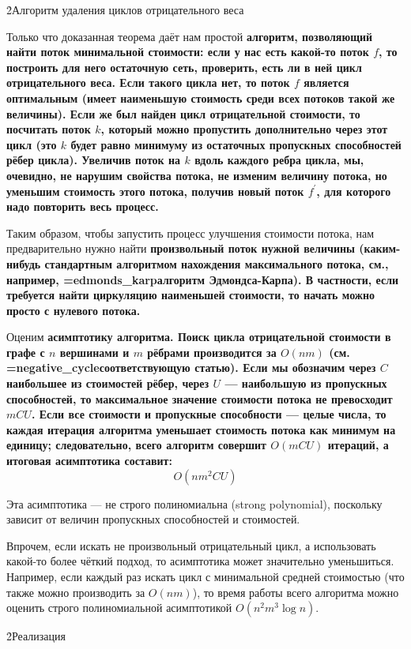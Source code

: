 \h2{Алгоритм удаления циклов отрицательного веса}

Только что доказанная теорема даёт нам простой \bf{алгоритм}, позволяющий найти поток минимальной стоимости: если у нас есть какой-то поток $f$, то построить для него остаточную сеть, проверить, есть ли в ней цикл отрицательного веса. Если такого цикла нет, то поток $f$ является оптимальным (имеет наименьшую стоимость среди всех потоков такой же величины). Если же был найден цикл отрицательной стоимости, то посчитать поток $k$, который можно пропустить дополнительно через этот цикл (это $k$ будет равно минимуму из остаточных пропускных способностей рёбер цикла). Увеличив поток на $k$ вдоль каждого ребра цикла, мы, очевидно, не нарушим свойства потока, не изменим величину потока, но уменьшим стоимость этого потока, получив новый поток $f^\prime$, для которого надо повторить весь процесс.

Таким образом, чтобы запустить процесс улучшения стоимости потока, нам предварительно нужно найти \bf{произвольный поток нужной величины} (каким-нибудь стандартным алгоритмом нахождения максимального потока, см., например, \algohref=edmonds_karp{алгоритм Эдмондса-Карпа}). В частности, если требуется найти циркуляцию наименьшей стоимости, то начать можно просто с нулевого потока.

Оценим \bf{асимптотику} алгоритма. Поиск цикла отрицательной стоимости в графе с $n$ вершинами и $m$ рёбрами производится за $O(nm)$ (см. \algohref=negative_cycle{соответствующую статью}). Если мы обозначим через $C$ наибольшее из стоимостей рёбер, через $U$ --- наибольшую из пропускных способностей, то максимальное значение стоимости потока не превосходит $mCU$. Если все стоимости и пропускные способности --- целые числа, то каждая итерация алгоритма уменьшает стоимость потока как минимум на единицу; следовательно, всего алгоритм совершит $O(mCU)$ итераций, а итоговая асимптотика составит:
$$ O(nm^2CU) $$

Эта асимптотика --- не строго полиномиальна (strong polynomial), поскольку зависит от величин пропускных способностей и стоимостей.

Впрочем, если искать не произвольный отрицательный цикл, а использовать какой-то более чёткий подход, то асимптотика может значительно уменьшиться. Например, если каждый раз искать цикл с минимальной средней стоимостью (что также можно производить за $O(nm)$), то время работы всего алгоритма можно оценить строго полиномиальной асимптотикой $O(n^2 m^3 \log n)$.

\h2{Реализация}

